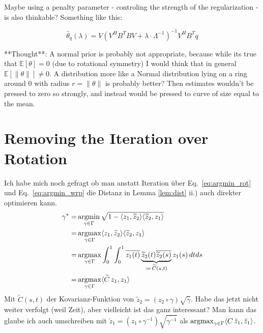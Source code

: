 Maybe using a penalty parameter - controling the strength of the regularization - is also thinkable? Something like this:

$$ \hat\theta_q(\lambda) = V ( V^H B^T B V + \lambda \cdot \Lambda^{-1})^{-1} V^H B^T q$$

**Thought**: A normal prior is probably not appropriate, because while its true that $\mathbb{E}[\theta] = 0$ (due to rotational symmetry) I would think that in general $\mathbb{E}[\lVert\theta\rVert] \neq 0$. A distribution more like a Normal distribution lying on a ring around 0 with radius $r = \lVert\theta\rVert$ is probably better? Then estimates wouldn't be pressed to zero so strongly, and instead would be pressed to curve of size equal to the mean.


\section{Removing the Iteration over Rotation}
\label{app:a-warping}
Ich habe mich noch gefragt ob man anstatt Iteration über Eq.\ \ref{eq:argmin_rot} und Eq.\ \ref{eq:argmin_wrp} die Distanz in Lemma \ref{lem:dist} ii.) auch direkter optimieren kann.
\begin{align*}
  \gamma^* = & \operatorname*{argmin}_{\gamma \in \Gamma} \sqrt{1 - \langle z_1, \widetilde z_2 \rangle \langle \widetilde z_2, z_1 \rangle } \\
    = & \operatorname*{argmax}_{\gamma \in \Gamma} \langle z_1, \widetilde z_2 \rangle \langle \widetilde z_2, z_1 \rangle \\
    = & \operatorname*{argmax}_{\gamma \in \Gamma} \int_0^1 \int_0^1
    \overline{z_1(t)} \underbrace{\widetilde z_2(t) \overline{\widetilde z_2(s)}}_{\coloneqq \, {\widetilde C}(s,t)} z_1(s) \, dt ds \\
    = & \operatorname*{argmax}_{\gamma \in \Gamma} \langle \widetilde C \, z_1, z_1 \rangle
\end{align*}
Mit $\widetilde C(s,t)$ der Kovarianz-Funktion von $\widetilde z_2 = (z_2 \circ \gamma) \sqrt{\dot\gamma}$.
Habe das jetzt nicht weiter verfolgt (weil Zeit), aber vielleicht ist das ganz interessant?
Man kann das glaube ich auch umschreiben mit $\breve z_1 = (z_1 \circ \gamma^{-1}) \sqrt{\dot{\gamma^{-1}}}$ als $\operatorname*{argmax}_{\gamma \in \Gamma} \langle C \, \breve z_1, \breve z_1 \rangle$.

